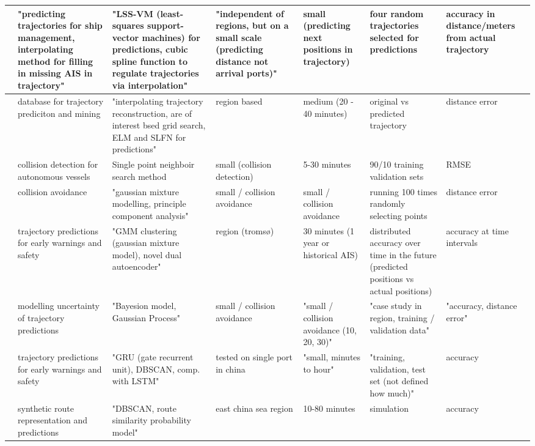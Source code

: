 \begin{sidewaystable}
{\begin{tabular}{|l|l|l|l|l|l|l|}
        \cite{Liu2020PredictingLearning} & "predicting trajectories for ship management, interpolating method for filling in missing AIS in trajectory" & "LSS-VM (least-squares support-vector machines) for predictions, cubic spline function to regulate trajectories via interpolation" & "independent of regions, but on a small scale (predicting distance not arrival ports)" & small (predicting next positions in trajectory) & four random trajectories selected for predictions & accuracy in distance/meters from actual trajectory \\ \hline
        \cite{Mao2018AnMining} & database for trajectory prediciton and mining & "interpolating trajectory reconstruction, are of interest bsed grid search, ELM and SLFN for predictions" & region based & medium (20 - 40 minutes) & original vs predicted trajectory & distance error \\ \hline
        \cite{Murray2018AOperations} & collision detection for autonomous vessels & Single point neighboir search method & small (collision detection) & 5-30 minutes & 90/10 training validation sets & RMSE \\ \hline
        \cite{Murray2019AnVessels} & collision avoidance & "gaussian mixture modelling, principle component analysis" & small / collision avoidance & small / collision avoidance & running 100 times randomly selecting points & distance error \\ \hline
        \cite{Murray2020AData} & trajectory predictions for early warnings and safety & "GMM clustering (gaussian mixture model), novel dual autoencoder" & region (tromsø) & 30 minutes (1 year or historical AIS) & distributed accuracy over time in the future (predicted positions vs actual positions) & accuracy at time intervals \\ \hline
        \cite{Rong2019ShipModel} & modelling uncertainty of trajectory predictions & "Bayesion model, Gaussian Process" & small / collision avoidance & "small / collision avoidance (10, 20, 30)" & "case study in region, training / validation data" & "accuracy, distance error" \\ \hline
        \cite{Suo2020ANetwork} & trajectory predictions for early warnings and safety & "GRU (gate recurrent unit), DBSCAN, comp. with LSTM" & tested on single port in china & "small, minutes to hour" & "training, validation, test set (not defined how much)" & accuracy \\ \hline
        \cite{Tafa2019AutomaticPrediction} & synthetic route representation and predictions & "DBSCAN, route similarity probability model" & east china sea region & 10-80 minutes & simulation & accuracy \\ \hline

\end{tabular}}
\end{sidewaystable}
